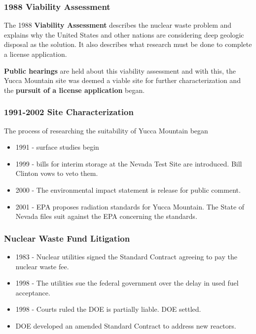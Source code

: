 
\begin{frame}
    \frametitle{1988 Viability Assessment}

    The 1988 \textbf{Viability Assessment} describes the nuclear waste problem and 
    explains why the United States and other nations are considering deep 
    geologic disposal as the solution. It also describes what research must be 
    done to complete a license application.

    \textbf{Public hearings} are held about this viability assessment and with this, the 
    Yucca Mountain site was deemed a viable site for further characterization 
    and the \textbf{pursuit of a license application} began. 

  \end{frame}

\begin{frame}
    \frametitle{1991-2002 Site Characterization}
    The process of researching the suitability of Yucca Mountain began 
    \begin{itemize}
      \item 1991 - surface studies begin 
      \item 1999 - bills for interim storage at the Nevada Test Site are 
        introduced. Bill Clinton vows to veto them.
      \item 2000 - The environmental impact statement is release for public 
        comment.
      \item 2001 - EPA proposes radiation standards for Yucca Mountain. The 
        State of Nevada files suit against the EPA concerning the standards.
    \end{itemize}
  \end{frame}

\begin{frame}
\frametitle{Nuclear Waste Fund Litigation}
    \begin{itemize}
    \item 1983 - Nuclear utilities signed the Standard Contract agreeing to pay the nuclear waste fee.
    \item 1998 - The utilities sue the federal government over the delay in used fuel acceptance.
    \item 1998 - Courts ruled the DOE is partially liable. DOE settled. 
    \item DOE developed an amended Standard Contract \cite{doe_standard_????} to 
      address new reactors.
  \end{itemize}
\end{frame}

